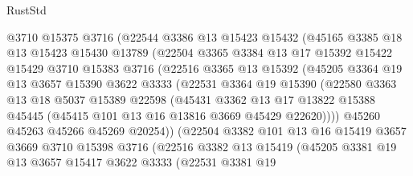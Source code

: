 \begin{lexlean}{RustStd}
\begin{coremodule}
              @3710
              @15375
              @3716
              (@22544
                @3386
                @13
                @15423
                @15432
                (@45165
                  @3385
                  @18
                  @13
                  @15423
                  @15430
                  @13789
                  (@22504
                    @3365
                    @3384
                    @13
                    @17
                    @15392
                    @15422
                    @15429
                    @3710
                    @15383
                    @3716
                    (@22516
                      @3365
                      @13
                      @15392
                      (@45205
                        @3364
                        @19
                        @13
                        @3657
                        @15390
                        @3622
                        @3333
                        (@22531
                          @3364
                          @19
                          @15390
                          (@22580
                            @3363
                            @13
                            @18
                            @5037
                            @15389
                            @22598
                            (@45431
                              @3362
                              @13
                              @17
                              @13822
                              @15388
                              @45445
                              (@45415 @101 @13 @16 @13816 @3669 @45429 @22620))))
                        @45260
                        @45263
                        @45266
                        @45269
                        @20254))
                    (@22504
                      @3382
                      @101
                      @13
                      @16
                      @15419
                      @3657
                      @3669
                      @3710
                      @15398
                      @3716
                      (@22516
                        @3382
                        @13
                        @15419
                        (@45205
                          @3381
                          @19
                          @13
                          @3657
                          @15417
                          @3622
                          @3333
                          (@22531
                            @3381
                            @19

\end{coremodule}
\end{lexlean}
